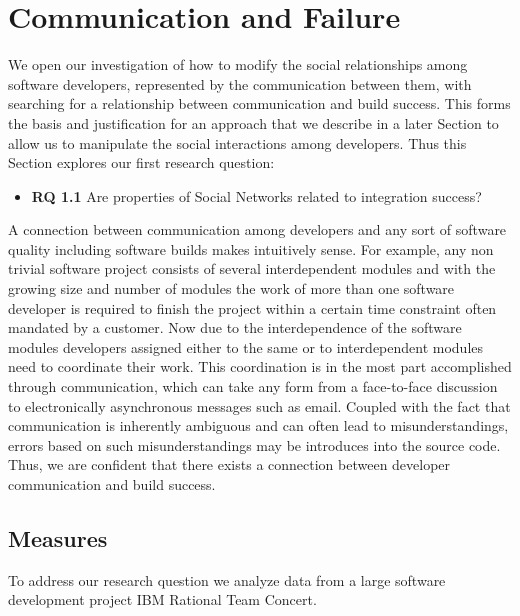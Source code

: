 \section{Communication and Failure}
\label{chap:soc-net}
We open our investigation of how to modify the social relationships among software developers, represented by the communication between them, with searching for a relationship between communication and build success.
This forms the basis and justification for an approach that we describe in a later Section to allow us to manipulate the social interactions among developers.
Thus this Section explores our first research question:
\begin{itemize}
\item\textbf{RQ 1.1} Are properties of Social Networks related to integration success?
\end{itemize}

A connection between communication among developers and any sort of software quality including software builds makes intuitively sense.
For example, any non trivial software project consists of several interdependent modules and with the growing size and number of modules the work of more than one software developer is required to finish the project within a certain time constraint often mandated by a customer.
Now due to the interdependence of the software modules developers assigned either to the same or to interdependent modules need to coordinate their work.
This coordination is in the most part accomplished through communication, which can take any form from a face-to-face discussion to electronically asynchronous messages such as email.
Coupled with the fact that communication is inherently ambiguous and can often lead to misunderstandings, errors based on such misunderstandings may be introduces into the source code.
Thus, we are confident that there exists  a connection between developer communication and build success.



\subsection{Measures}
\label{sec:Methodology}
To address our research question we analyze data from a large software
development project IBM Rational Team Concert.

